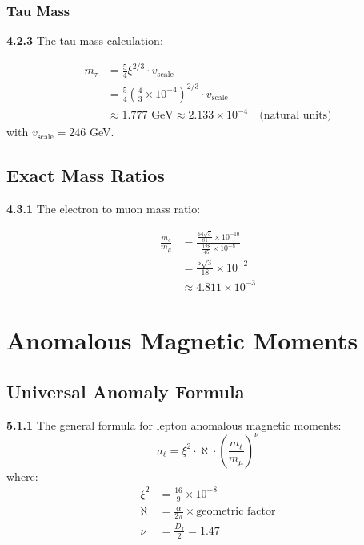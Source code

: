 \documentclass[12pt,a4paper]{article}
\newcommand{\xipar}{\xi}
\begin{document}
	\subsubsection{Tau Mass}
	
	\noindent \textbf{4.2.3} The tau mass calculation:
	\begin{keyresult}
		\begin{align}
			m_\tau &= \frac{5}{4} \xipar^{2/3} \cdot v_{\text{scale}} \\
			&= \frac{5}{4} \left( \frac{4}{3} \times 10^{-4} \right)^{2/3} \cdot v_{\text{scale}} \\
			&\approx 1.777 \text{ GeV} \approx 2.133 \times 10^{-4} \quad \text{(natural units)}
		\end{align}
		with $v_{\text{scale}} = 246$ GeV.
	\end{keyresult}
	
	\subsection{Exact Mass Ratios}
	
	\noindent \textbf{4.3.1} The electron to muon mass ratio:
	\begin{keyresult}
		\begin{align}
			\frac{m_e}{m_\mu} &= \frac{\frac{64 \sqrt{3}}{81} \times 10^{-10}}{\frac{128}{45} \times 10^{-8}} \\
			&= \frac{5 \sqrt{3}}{18} \times 10^{-2} \\
			&\approx 4.811 \times 10^{-3}
		\end{align}
	\end{keyresult}
	
	\section{Anomalous Magnetic Moments}
	
	\subsection{Universal Anomaly Formula}
	
	\noindent \textbf{5.1.1} The general formula for lepton anomalous magnetic moments:
	\begin{equation}
		a_\ell = \xipar^2 \cdot \aleph \cdot \left( \frac{m_\ell}{m_\mu} \right)^\nu
	\end{equation}
	where:
	\begin{align}
		\xipar^2 &= \frac{16}{9} \times 10^{-8} \\
		\aleph &= \frac{\alpha}{2\pi} \times \text{geometric factor} \\
		\nu &= \frac{D_f}{2} = 1.47
	\end{align}
	
\end{document}

